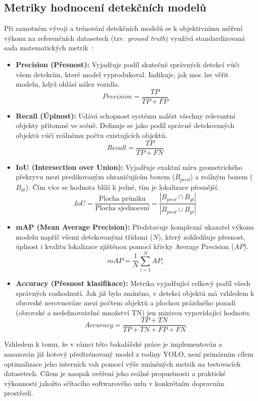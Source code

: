 \documentclass[male,czech,api_bc]{kitheses}
\begin{document}
\subsection{Metriky hodnocení detekčních modelů}
Při samotném vývoji a trénování detekčních modelů se k objektivnímu měření výkonu na referenčních datasetech (tzv. \textit{ground truth}) využívá standardizovaná sada matematických metrik~\cite{szeliski_computer_vision}:

\begin{itemize}
    \item \textbf{Precision (Přesnost):} Vyjadřuje podíl skutečně správných detekcí vůči všem detekcím, které model vyprodukoval. Indikuje, jak moc lze věřit modelu, když ohlásí nález vozidla.
    $$ Precision = \frac{TP}{TP + FP} $$
    \item \textbf{Recall (Úplnost):} Udává schopnost systému nalézt všechny relevantní objekty přítomné ve scéně. Definuje se jako podíl správně detekovaných objektů vůči reálnému počtu existujících objektů.
    $$ Recall = \frac{TP}{TP + FN} $$
    \item \textbf{IoU (Intersection over Union):} Vyjadřuje exaktní míru geometrického překryvu mezi predikovaným ohraničujícím boxem ($B_{pred}$) a reálným boxem ($B_{gt}$). Čím více se hodnota blíží k jedné, tím je lokalizace přesnější.
    $$ IoU = \frac{\text{Plocha průniku}}{\text{Plocha sjednocení}} = \frac{|B_{pred} \cap B_{gt}|}{|B_{pred} \cup B_{gt}|} $$
    \item \textbf{mAP (Mean Average Precision):} Představuje komplexní ukazatel výkonu modelu napříč všemi detekovanými třídami ($N$), který zohledňuje přesnost, úplnost i kvalitu lokalizace zjištěnou pomocí křivky Average Precision ($AP$).
    $$ mAP = \frac{1}{N} \sum_{i=1}^{N} AP_i $$
    \item \textbf{Accuracy (Přesnost klasifikace):} Metrika vyjadřující celkový podíl všech správných rozhodnutí. Jak již bylo zmíněno, v detekci objektů má vzhledem k obrovské nerovnováze mezi počtem objektů a plochou prázdného pozadí (obrovské a nedefinovatelné množství TN) jen mizivou vypovídající hodnotu.
    $$ Accuracy = \frac{TP + TN}{TP + TN + FP + FN} $$
\end{itemize}

Vzhledem k tomu, že v rámci této bakalářské práce je implementován a nasazován již hotový předtrénovaný model z rodiny YOLO, není primárním cílem optimalizace jeho interních vah pomocí výše zmíněných metrik na testovacích datasetech. Cílem je naopak ověření jeho reálné propustnosti a praktické výkonnosti jakožto sčítacího softwarového uzlu v konkrétním dopravním prostředí.
\end{document}
